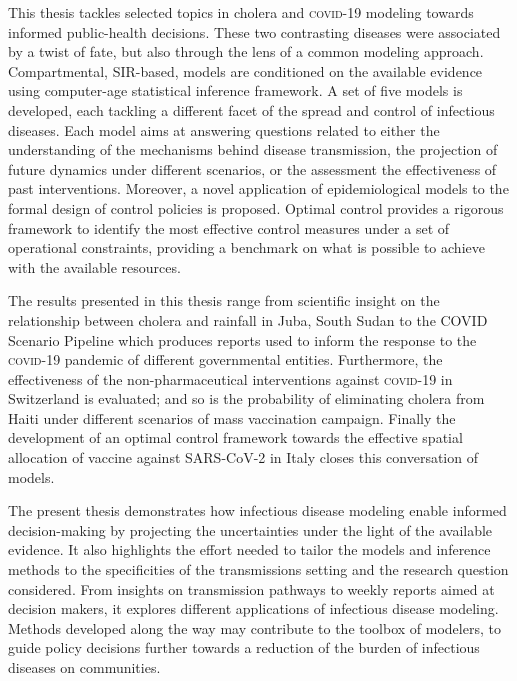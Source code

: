 This thesis tackles selected topics in cholera and \textsc{covid}-19 modeling towards informed public-health decisions. These two contrasting diseases were associated by a twist of fate, but also through the lens of a common modeling approach.  Compartmental, SIR-based, models are conditioned on the available evidence using computer-age statistical inference framework. A set of five models is developed, each tackling a different facet of the spread and control of infectious diseases. Each model aims at answering questions related to either the understanding of the mechanisms behind disease transmission, the projection of future dynamics under different scenarios, or the assessment the effectiveness of past interventions. Moreover, a novel application of epidemiological models to the formal design of control policies is proposed. Optimal control provides a rigorous framework to identify the most effective control measures under a set of operational constraints, providing a benchmark on what is possible to achieve with the available resources.

The results presented in this thesis range from scientific insight on the relationship between cholera and rainfall in Juba, South Sudan to the COVID Scenario Pipeline which produces reports used to inform the response to the \textsc{covid}-19 pandemic of different governmental entities. Furthermore, the effectiveness of the non-pharmaceutical interventions against \textsc{covid}-19 in Switzerland is evaluated; and so is the probability of eliminating cholera from Haiti under different scenarios of mass vaccination campaign. Finally the development of an optimal control framework towards the effective spatial allocation of vaccine against SARS-CoV-2 in Italy closes this conversation of models.

The present thesis demonstrates how infectious disease modeling enable informed decision-making by projecting the uncertainties under the light of the available evidence. It also highlights the effort needed to tailor the models and inference methods to the specificities of the transmissions setting and the research question considered. From insights on transmission pathways to weekly reports aimed at decision makers, it explores different applications of infectious disease modeling. Methods developed along the way may contribute to the toolbox of modelers, to guide policy decisions further towards a reduction of the burden of infectious diseases on communities.

 \vspace{-.5cm}
